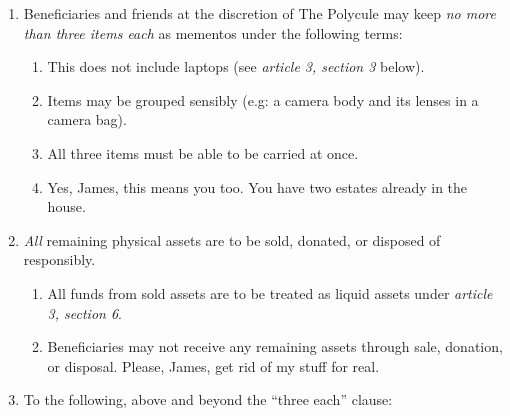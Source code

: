 \documentclass[oneside]{memoir}
\begin{document}
\begin{enumerate}
\def\labelenumi{\arabic{enumi}.}
\tightlist
\item
  Beneficiaries and friends at the discretion of The Polycule may keep \emph{no more than three items each} as mementos under the following terms:

  \begin{enumerate}
  \def\labelenumii{\arabic{enumii}.}
  \tightlist
  \item
    This does not include laptops (see \emph{article 3, section 3} below).
  \item
    Items may be grouped sensibly (e.g: a camera body and its lenses in a camera bag).
  \item
    All three items must be able to be carried at once.
  \item
    Yes, James, this means you too. You have two estates already in the house.
  \end{enumerate}
\item
  \emph{All} remaining physical assets are to be sold, donated, or disposed of responsibly.

  \begin{enumerate}
  \def\labelenumii{\arabic{enumii}.}
  \tightlist
  \item
    All funds from sold assets are to be treated as liquid assets under \emph{article 3, section 6}.
  \item
    Beneficiaries may not receive any remaining assets through sale, donation, or disposal. Please, James, get rid of my stuff for real.
  \end{enumerate}
\item
  To the following, above and beyond the ``three each'' clause:


\end{enumerate}
\end{document}
